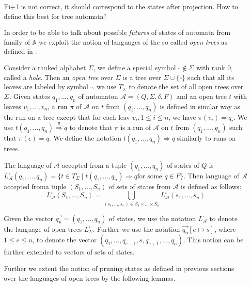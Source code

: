{\color{red} Fi+1 is not correct, it should correspond to the states after
projection. How to define this best for tree automata?}

In order to be able to talk about possible \emph{futures} of states of automata
from family of $\mathbb{A}$ we exploit the notion of languages of the so called
\emph{open trees} as defined in \cite{tacas}.

Consider a ranked alphabet $\Sigma$, we define a special symbol $\square \notin
\Sigma$ with rank 0, called a \emph{hole}. Then an \emph{open tree} over
$\Sigma$ is a tree over $\Sigma \cup \{\square\}$ such that all its leaves are
labeled by symbol $\square$. we use $T_\Sigma^\square$ to denote the set of all
open trees over $\Sigma$. Given states $q_1,\ldots,q_n$ of automaton
$\mathcal{A} = (Q, \Sigma, \delta, F)$ and an open tree $t$ with leaves
$v_1,\ldots,v_n$, a run $\pi$ of $\mathcal{A}$ on $t$ from $(q_1,\ldots,q_n)$ is
defined in similar way as the run on a tree except that for each leav $v_i, 1
\leq i \leq n$, we have $\pi(v_i) = q_i$. We use $t(q_1,\ldots,q_n)
\overset{\pi}{\Longrightarrow} q$ to denote that $\pi$ is a run of $\mathcal{A}$
on $t$ from $(q_1,\ldots,q_n)$ such that $\pi(\epsilon) = q$. We define the
notation $t(q_1,\ldots,q_n) \Longrightarrow q$ similarly to runs on trees.

The language of $\mathcal{A}$ accepted from a tuple $(q_1,\ldots,q_n)$ of states
of $Q$ is $L^\square_\mathcal{A}(q_1,\ldots,q_n) = \{t \in T^\square_\Sigma
\mid t(q_1,\ldots,q_n) \Longrightarrow q \text{for some } q \in F\}$. Then
language of $\mathcal{A}$ accepted froma tuple $(S_1,\ldots,S_n)$ of sets of
states from $\mathcal{A}$ is defined as
follows:
\begin{equation}
L_\mathcal{A}^\square(S_1,\ldots,S_n) = \bigcup_{(s_1,\ldots,s_n) \in
S_1\times\ldots\times S_n} L_\mathcal{A}^\square(s_1,\ldots,s_n)
\end{equation}

Given the vector $\overset{\rightarrow}{q_n} = (q_1,\ldots,q_n)$ of states, we
use the notation $L_\mathcal{A}^\square$ to denote the language of open trees
$L_\Sigma^\square$. Further we use the notation $\overset{\rightarrow}{q_n}[e
\mapsto s]$, where $1 \leq e \leq n$, to denote the vector
$(q_1,\ldots,q_{e-1}, s, q_{e+1},\ldots,q_n)$. This notion can be further
extended to vectors of sets of states.

Further we extent the notion of pruning states as defined in previous sections
over the languages of open trees by the following lemmas.

